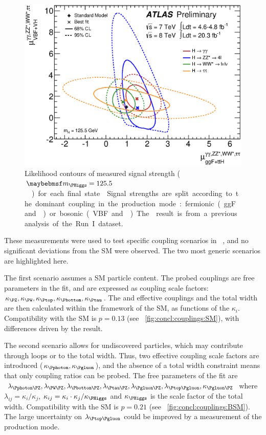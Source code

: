 \begin{figure}[t]
	\includegraphics[width=\largefigwidth]{tex/conclusions/atlas_mu_2D}
	\caption{Likelihood contours of measured signal strength (\unit{$\mH = 125.5$}{\GeV}) 
	for each final state \cite{ATLAS:couplings:Moriond14}. Signal strengths are split 
	according to the dominant coupling in the production mode: fermionic (ggF and \ttH) 
	or bosonic (VBF and \VH). The \HWW result is from a previous analysis of the Run~I 
	dataset.}
	\label{fig:concl:mu_2D}
\end{figure}

These measurements were used to test specific coupling scenarios in 
\Reference~\cite{ATLAS:couplings:Moriond14}, and no significant deviations from the SM 
were observed. The two most generic scenarios are highlighted here. 

The first scenario assumes a SM particle content. The probed couplings are free 
parameters in the fit, and are expressed as coupling scale factors: 
$\kappa_{\PZ}, \kappa_{\PW}, \kappa_{\Ptop}, \kappa_{\Pbottom}, \kappa_{\Ptau}$. The 
\HepProcess{\PHiggs\Pphoton\Pphoton} and \HepProcess{\PHiggs\Pgluon\Pgluon} effective 
couplings and the total width are then calculated within the framework of the SM, as 
functions of the $\kappa_i$. Compatibility with the SM is $p = 0.13$ (see 
\Figure~\ref{fig:concl:couplings:SM}), with differences driven by the 
\HepProcess{\PHiggs \HepTo \Pbottom\APbottom} result.

The second scenario allows for undiscovered particles, which may contribute through loops 
or to the total width. Thus, two effective coupling scale factors are introduced 
($\kappa_{\Pphoton}, \kappa_{\Pgluon}$), and the absence of a total width constraint 
means that only coupling ratios can be probed. The free parameters of the fit are 
$\lambda_{\Pphoton\PZ}, \lambda_{\PW\PZ}, \lambda_{\Pbottom\PZ}, \lambda_{\Ptau\PZ}, 
\lambda_{\Pgluon\PZ}, \lambda_{\Ptop\Pgluon}, \kappa_{\Pgluon\PZ}$ where 
$\lambda_{ij} = \kappa_i / \kappa_j$, $\kappa_{ij} = \kappa_i \cdot \kappa_j / 
\kappa_{\PHiggs}$ and $\kappa_{\PHiggs}$ is the scale factor of the total width. 
Compatibility with the SM is $p = 0.21$ (see \Figure~\ref{fig:concl:couplings:BSM}). The 
large uncertainty on $\lambda_{\Ptop\Pgluon}$ could be improved by a measurement of the 
\ttH production mode.

